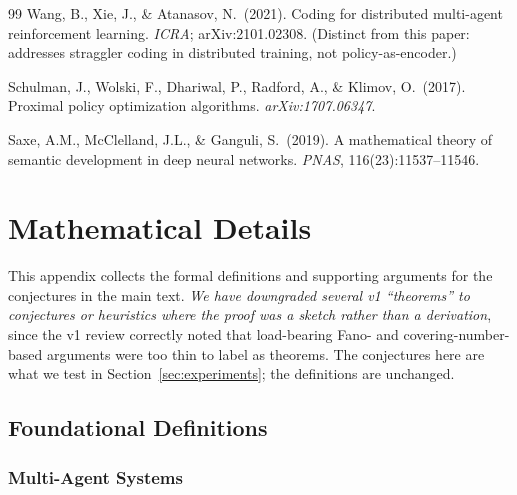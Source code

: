 \documentclass[10pt, letterpaper]{article}
\begin{document}
\begin{thebibliography}{99}
 Wang, B., Xie, J., \& Atanasov, N.\ (2021). Coding for distributed multi-agent reinforcement learning. \emph{ICRA}; arXiv:2101.02308. (Distinct from this paper: addresses straggler coding in distributed training, not policy-as-encoder.)

 Schulman, J., Wolski, F., Dhariwal, P., Radford, A., \& Klimov, O.\ (2017). Proximal policy optimization algorithms. \emph{arXiv:1707.06347}.

 Saxe, A.M., McClelland, J.L., \& Ganguli, S.\ (2019). A mathematical theory of semantic development in deep neural networks. \emph{PNAS}, 116(23):11537--11546.

\end{thebibliography}

\appendix

\section{Mathematical Details}
\label{app:math}

This appendix collects the formal definitions and supporting arguments for the conjectures in the main text. \emph{We have downgraded several v1 ``theorems'' to conjectures or heuristics where the proof was a sketch rather than a derivation}, since the v1 review correctly noted that load-bearing Fano- and covering-number-based arguments were too thin to label as theorems. The conjectures here are what we test in Section~\ref{sec:experiments}; the definitions are unchanged.

\subsection{Foundational Definitions}

\subsubsection{Multi-Agent Systems}
\end{document}

